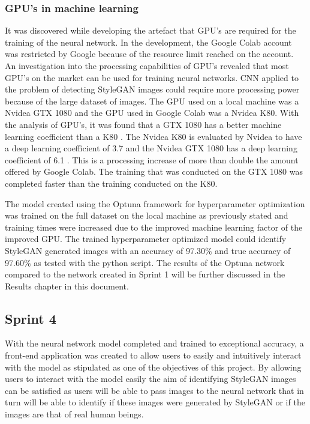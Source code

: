 \subsubsection{GPU's in machine learning}

It was discovered while developing the artefact that GPU's are required for the training of the neural network. In the development, the Google Colab account was restricted by Google because of the resource limit reached on the account. An investigation into the processing capabilities of GPU's revealed that most GPU's on the market can be used for training neural networks. CNN applied to the problem of detecting StyleGAN images could require more processing power because of the large dataset of images. The GPU used on a local machine was a Nvidea GTX 1080 and the GPU used in Google Colab was a Nvidea K80. With the analysis of GPU's, it was found that a GTX 1080 has a better machine learning coefficient than a K80 \citep{cuda2021}. The Nvidea K80 is evaluated by Nvidea to have a deep learning coefficient of 3.7 and the Nvidea GTX 1080 has a deep learning coefficient of 6.1 \citep{cuda2021}. This is a processing increase of more than double the amount offered by Google Colab. The training that was conducted on the GTX 1080 was completed faster than the training conducted on the K80.

The model created using the Optuna framework for hyperparameter optimization was trained on the full dataset on the local machine as previously stated and training times were increased due to the improved machine learning factor of the improved GPU. The trained hyperparameter optimized model could identify StyleGAN generated images with an accuracy of 97.30\% and true accuracy of 97.60\% as tested with the python script. The results of the Optuna network compared to the network created in Sprint 1 will be further discussed in the Results chapter in this document.


\subsection{Sprint 4}

With the neural network model completed and trained to exceptional accuracy, a front-end application was created to allow users to easily and intuitively interact with the model as stipulated as one of the objectives of this project. By allowing users to interact with the model easily the aim of identifying StyleGAN images can be satisfied as users will be able to pass images to the neural network that in turn will be able to identify if these images were generated by StyleGAN or if the images are that of real human beings. 

